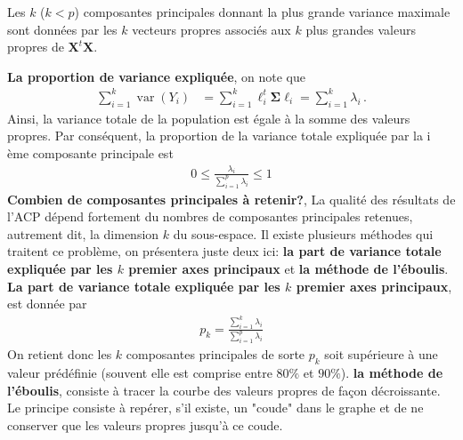 \begin{lemma}
Les $k$ ($k<p$) composantes principales donnant la plus grande variance maximale sont données par les $k$ vecteurs propres associés aux $k$ plus grandes valeurs propres de $\mathbf{X}^t \mathbf{X}$.
\end{lemma}

\noindent \textbf{La proportion de variance expliquée}, on note que 
\begin{align*}
\sum_{i=1}^{k}\operatorname{var}\left(Y_{i}\right) &=\sum_{i=1}^{k}\ell_{i}^{t} \boldsymbol{\Sigma} \ell_{i}=\sum_{i=1}^{k}\lambda_i \,.
\end{align*}
Ainsi, la variance totale de la population est égale à la somme des valeurs propres. Par conséquent, la proportion de la variance totale expliquée par la i ème composante principale est 
\begin{align*}
0\leq \frac{\lambda_i}{\sum_{i=1}^{p}\lambda_i }\leq 1
\end{align*}
\textbf{Combien de composantes principales à retenir?}, 
La qualité des résultats de l'ACP dépend fortement du nombres de composantes principales retenues, autrement dit, la dimension  $k$ du sous-espace. Il existe plusieurs méthodes qui traitent ce problème, on présentera juste deux ici: \textbf{la part de variance totale expliquée par les $k$ premier axes principaux} et \textbf{la méthode de l'éboulis}.\\
\textbf{La part de variance totale expliquée par les $k$ premier axes principaux}, est donnée par 
\begin{align*}
p_k=\frac{\sum_{i=1}^{k} \lambda_i}{\sum_{i=1}^{p}\lambda_i }
\end{align*}
On retient donc les $k$ composantes principales de sorte $p_k$  soit supérieure à une valeur prédéfinie (souvent elle est  comprise entre $80\%$ et $90\%$). \newl
\textbf{la méthode de l'éboulis}, consiste à tracer la courbe des valeurs propres de façon décroissante. Le principe consiste à repérer, s'il existe, un "coude" dans le graphe et de ne conserver que les valeurs propres jusqu'à ce coude.
